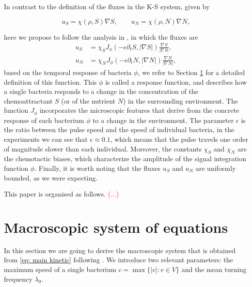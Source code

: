 \documentclass[11pt,twoside]{article}
\theoremstyle{nonumberplain}
\begin{document}
In contrast to the definition of the fluxes in the K-S system, given by

\begin{equation}
    u_S = \chi(\rho, S) \nabla S, \quad \quad u_N = \chi(\rho, N) \nabla N,
    \nonumber
\end{equation}

here we propose to follow the analysis in \cite{dolak2005kinetic}, in which the fluxes are 
\begin{equation} \label{fluxes}
\begin{split}
     u_S &= \chi_S J_\phi (-\epsilon \partial_t S, |\nabla S|) \frac{\nabla S}{|\nabla S|}, \\ 
    u_N &= \chi_N J_\phi (-\epsilon \partial_t N, |\nabla N|) \frac{\nabla N}{|\nabla N|},   
\end{split}
\end{equation}
based on the temporal response of bacteria $\phi$, we refer to Section \ref{sec: maro system} for a detailed definition of this function. This $\phi$ is called a response function, and describes how a single bacteria responds to a change in the concentration of the chemoattractant $S$ (or of the nutrient $N$) in the surrounding environment. The function $J_\phi$ incorporates the microscopic features that derive from the concrete response of each bacterium $\phi$ to a change in the environment. The parameter $\epsilon$ is the ratio between the pulse speed and the speed of
individual bacteria, in the experiments we can see that $\epsilon \approx 0.1$, which means that the pulse travels one order of magnitude slower than each individual. Moreover, the constants $\chi_S$ and $ \chi_N$ are the chemotactic biases, which characterize the amplitude of the signal integration function $\phi$. Finally, it is worth noting that the fluxes $u_S$ and $u_N$ are uniformly bounded, as we were expecting.

This paper is organised as follows. \textcolor{red}{(...)}


\section{Macroscopic system of equations}\label{sec: maro system}
In this section we are going to derive the macroscopic system that is obtained from \eqref{eq: main kinetic} following \cite{saragosti2010mathematical}. We introduce two relevant parameters: the maximum speed of a single bacterium $c = \max\{|v|: v \in V\}$ and the mean turning frequency $\lambda_0$.
\end{document}
